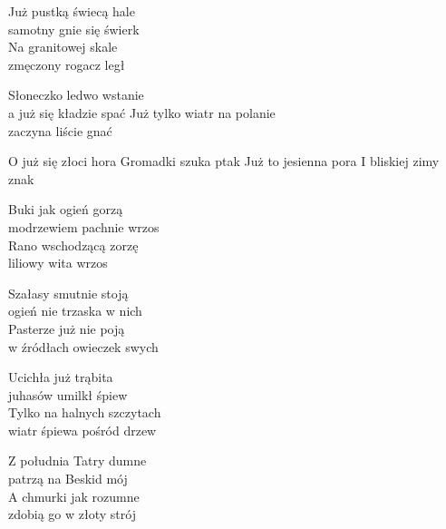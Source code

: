 \begin{text}
    Już pustką świecą hale\\
    samotny gnie się świerk\\
    Na granitowej skale\\
    zmęczony rogacz legł

    Słoneczko ledwo wstanie\\
    a już się kładzie spać
    Już tylko wiatr na polanie\\
    zaczyna liście gnać

    \vin O już się złoci hora
    \vin Gromadki szuka ptak
    \vin Już to jesienna pora
    \vin I bliskiej zimy znak

    Buki jak ogień gorzą\\
    modrzewiem pachnie wrzos\\
    Rano wschodzącą zorzę\\
    liliowy wita wrzos

    Szałasy smutnie stoją\\
    ogień nie trzaska w nich\\
    Pasterze już nie poją\\
    w źródłach owieczek swych

    Ucichła już trąbita\\
    juhasów umilkł śpiew\\
    Tylko na halnych szczytach\\
    wiatr śpiewa pośród drzew

    Z południa Tatry dumne\\
    patrzą na Beskid mój\\
    A chmurki jak rozumne\\
    zdobią go w złoty strój
\end{text}
